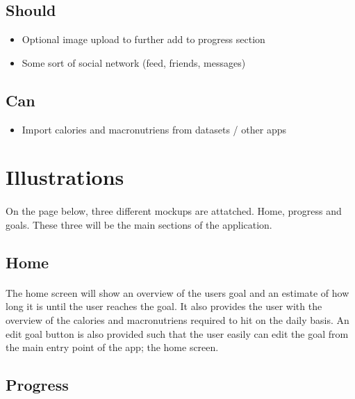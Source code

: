 \documentclass{article}
\begin{document}
      \hfill \break

    \subsection{Should}
      \begin{itemize}
        \item Optional image upload to further add to progress section
        \item Some sort of social network (feed, friends, messages)
      \end{itemize}

      \hfill \break

    \subsection{Can}
      \begin{itemize}
        \item Import calories and macronutriens from datasets / other apps
      \end{itemize}

\newpage
\section{Illustrations}
  \paragraph{}
  On the page below, three different mockups are attatched. Home, progress and goals. These three will be the main sections of the application.

  \hfill \break

  \subsection{Home}
    \paragraph{}
    The home screen will show an overview of the users goal and an estimate of how long it is until the user reaches the goal.
    It also provides the user with the overview of the calories and macronutriens required to hit on the daily basis. An edit goal button
    is also provided such that the user easily can edit the goal from the main entry point of the app; the home screen.

    \hfill \break

  \subsection{Progress}
\end{document}
